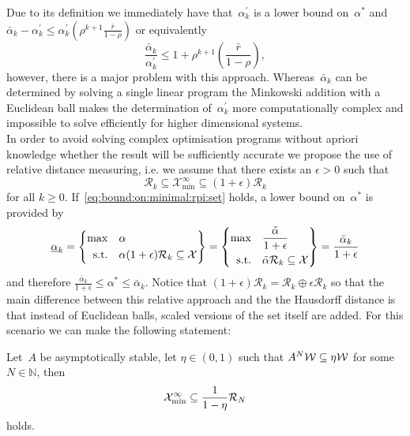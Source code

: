 %
Due to its definition we immediately have that~$\alpha_k^\prime$ is a lower bound on~$\alpha^\ast$ and $\bar\alpha_k-\alpha^\prime_k\leq\alpha^\prime_k(\rho^{k+1}\frac{\bar r}{1-\rho})$ or equivalently
%
\begin{equation}\label{eq:Hausdorff:bound:on:alpha:ast}
	\frac{\bar\alpha_k}{\alpha^\prime_k}\leq1+\rho^{k+1}\left(\frac{\bar r}{1-\rho}\right),
\end{equation}
%
however, there is a major problem with this approach.
%
Whereas~$\bar\alpha_k$ can be determined by solving a single linear program the Minkowski addition with a Euclidean ball makes the determination of~$\alpha^\prime_k$ more computationally complex and impossible to solve efficiently for higher dimensional systems.
%
\\[1em]
%
\mysplit In order to avoid solving complex optimisation programs without apriori knowledge whether the result will be sufficiently accurate we propose the use of relative distance measuring, i.e. we assume that there exists an $\epsilon>0$ such that 
%
\begin{equation}\label{eq:bound:on:minimal:rpi:set}
	\mathcal R_k\subseteq \mathcal X^\infty_{\min} \subseteq (1+\epsilon)\mathcal R_k
\end{equation}
%
for all $k\geq 0$. 
%
If~\eqref{eq:bound:on:minimal:rpi:set} holds, a lower bound on~$\alpha^\ast$ is provided by
%
\begin{equation}\label{eq:def:underline:alpha}
	\underline\alpha_k = \left\{\begin{aligned}\max&\quad\alpha\\
	\text{s.t.}&\quad \alpha(1+\epsilon)\mathcal R_k\subseteq\mathcal X
	\end{aligned}\right\} = \left\{\begin{aligned}\max&\quad\frac{\tilde\alpha}{1+\epsilon}\\
	\text{s.t.}&\quad \tilde\alpha\mathcal R_k\subseteq\mathcal X
	\end{aligned}\right\} = \frac{\bar\alpha_k}{1+\epsilon}
\end{equation}
%
and therefore $\frac{\bar\alpha_k}{1+\epsilon}\leq\alpha^\ast\leq\bar\alpha_k$.
%
Notice that $(1+\epsilon)\mathcal R_k=\mathcal R_k\oplus\epsilon\mathcal R_k$ so that the main difference between this relative approach and the the Hausdorff distance is that instead of Euclidean balls, scaled versions of the set itself are added.
%
For this scenario we can make the following statement:
%
\begin{thm}\label{thm:scaling:alpha:ast}
Let~$A$ be asymptotically stable, let $\eta\in(0,1)$ such that $A^N\mathcal W\subseteq\eta\mathcal W$ for some $N\in\mathbb N$, then 
%
\begin{equation}
	\mathcal X^\infty_{\min}\subseteq\frac{1}{1-\eta}\mathcal R_N
\end{equation}
%
holds.
\end{thm}
